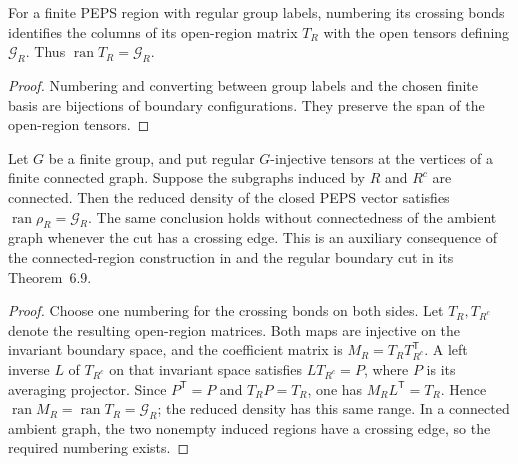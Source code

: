 \begin{lemma}%
    \label{thm:peps_regular_region_range}
    \leanok
    For a finite PEPS region with regular group labels, numbering its
    crossing bonds identifies the columns of its open-region matrix
    $T_R$ with the open tensors defining $\mathcal G_R$.
    Thus $\operatorname{ran}T_R=\mathcal G_R$.
\end{lemma}

\begin{proof}\leanok
    Numbering and converting between group labels and the chosen
    finite basis are bijections of boundary configurations. They
    preserve the span of the open-region tensors.
\end{proof}

\begin{theorem}%
    \label{thm:peps_regular_region_support}
    \leanok
    Let $G$ be a finite group, and put regular $G$-injective tensors at
    the vertices of a finite connected graph. Suppose the subgraphs
    induced by $R$ and $R^c$ are connected. Then the reduced density of
    the closed PEPS vector satisfies
    $\operatorname{ran}\rho_R=\mathcal G_R$.
    The same conclusion holds without connectedness of the ambient
    graph whenever the cut has a crossing edge.
    This is an auxiliary consequence of the connected-region
    construction in \cite[Lemma~5.2]{Schuch2010PEPS} and the regular
    boundary cut in its Theorem~6.9.
\end{theorem}

\begin{proof}\leanok
    Choose one numbering for the crossing bonds on both sides. Let
    $T_R,T_{R^c}$ denote the resulting open-region matrices. Both maps
    are injective on the invariant boundary space, and the coefficient
    matrix is $M_R=T_RT_{R^c}^{\mathsf T}$. A left inverse $L$ of
    $T_{R^c}$ on that invariant space satisfies
    $LT_{R^c}=P$, where $P$ is its averaging projector.
    Since $P^{\mathsf T}=P$ and $T_RP=T_R$, one has
    $M_RL^{\mathsf T}=T_R$.
    Hence $\operatorname{ran}M_R=\operatorname{ran}T_R=\mathcal G_R$;
    the reduced density has this same range. In a connected ambient
    graph, the two nonempty induced regions have a crossing edge, so
    the required numbering exists.
\end{proof}

